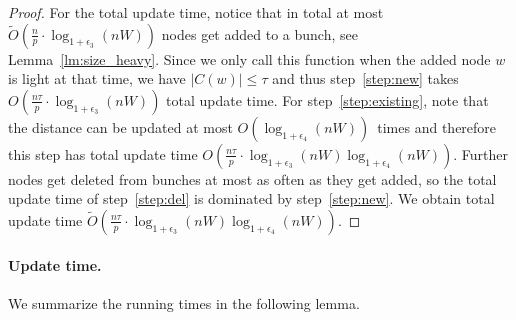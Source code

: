 \begin{proof}
    For the total update time, notice that in total at most $\tilde O(\tfrac{n}{p}\cdot \log_{1+\epsilon_3}(nW))$ nodes get added to a bunch, see Lemma~\ref{lm:size_heavy}. Since we only call this function when the added node $w$ is light at that time, we have $|C(w)|\leq \tau$ and thus step~\ref{step:new} takes $O(\tfrac{n\tau}{p}\cdot \log_{1+\epsilon_3}(nW))$ total update time. For step~\ref{step:existing}, note that the distance can be updated at most $O(\log_{1+\epsilon_4}(nW))$~times and therefore this step has total update time $O(\tfrac{n\tau}{p}\cdot \log_{1+\epsilon_3}(nW)\log_{1+\epsilon_4}(nW))$. Further nodes get deleted from bunches at most as often as they get added, so the total update time of step~\ref{step:del} is dominated by step~\ref{step:new}. We obtain total update time $\tilde O ( \tfrac{n\tau }{p} \cdot \log_{1+\epsilon_3}(nW)\log_{1+\epsilon_4}(nW)) $.
\end{proof}

\paragraph{Update time.}
We summarize the running times in the following lemma. 

